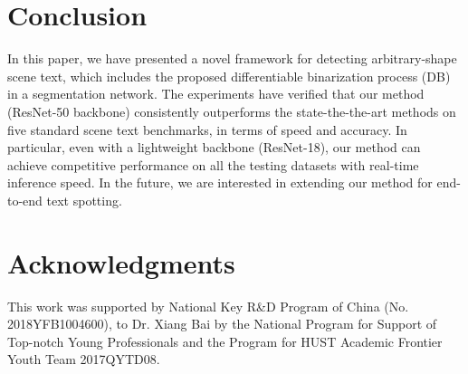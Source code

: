 \documentclass[letterpaper]{article} %
\begin{document}
\section{Conclusion}
In this paper, we have presented a novel framework for detecting arbitrary-shape scene text, which includes the proposed differentiable binarization process (DB) in a segmentation network. The experiments have verified that our method (ResNet-50 backbone) consistently outperforms the state-the-the-art methods on five standard scene text benchmarks, in terms of speed and accuracy. In particular, even with a lightweight backbone (ResNet-18), our method can achieve competitive performance on all the testing datasets with real-time inference speed. In the future, we are interested in extending our method for end-to-end text spotting. 


\section{Acknowledgments}
This work was supported by National Key R\&D Program of China (No. 2018YFB1004600), to Dr. Xiang Bai by the National Program for Support of Top-notch Young Professionals and the Program for HUST Academic Frontier Youth Team 2017QYTD08. 

{\fontsize{9.0pt}{10.0pt} \selectfont


}
\end{document}
